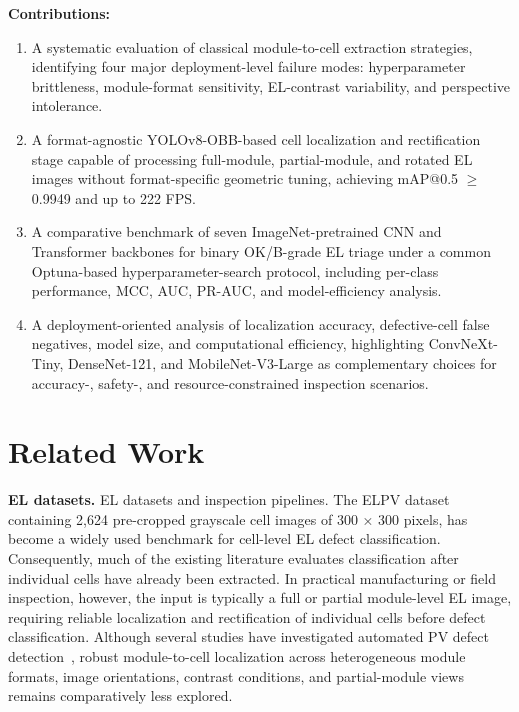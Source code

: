 \documentclass[conference]{IEEEtran}
\begin{document}
\textbf{Contributions:}
\begin{enumerate}
  \item A systematic evaluation of classical module-to-cell extraction strategies, identifying four major deployment-level failure modes: hyperparameter brittleness, module-format sensitivity, EL-contrast variability, and perspective intolerance.
  \item A format-agnostic YOLOv8-OBB-based cell localization and rectification stage capable of processing full-module, partial-module, and rotated EL images without format-specific geometric tuning, achieving mAP@0.5 $\geq$ 0.9949 and up to 222 FPS.
  \item A comparative benchmark of seven ImageNet-pretrained CNN and Transformer backbones for binary OK/B-grade EL triage under a common Optuna-based hyperparameter-search protocol, including per-class performance, MCC, AUC, PR-AUC, and model-efficiency analysis.
  \item A deployment-oriented analysis of localization accuracy, defective-cell false negatives, model size, and computational efficiency, highlighting ConvNeXt-Tiny, DenseNet-121, and MobileNet-V3-Large as complementary choices for accuracy-, safety-, and resource-constrained inspection scenarios.
\end{enumerate}

\section{Related Work}
\label{sec:related}

\textbf{EL datasets.} EL datasets and inspection pipelines. The ELPV dataset~\cite{deitsch2019} containing 2{,}624 pre-cropped grayscale cell images of 300 × 300 pixels, has become a widely used benchmark for cell-level EL defect classification. Consequently, much of the existing literature evaluates classification after individual cells have already been extracted. In practical manufacturing or field inspection, however, the input is typically a full or partial module-level EL image, requiring reliable localization and rectification of individual cells before defect classification. Although several studies have investigated automated PV defect detection~\cite{zhao2022, su2021, li2023, chen2024, wang2023}, robust module-to-cell localization across heterogeneous module formats, image orientations, contrast conditions, and partial-module views remains comparatively less explored.
\end{document}
